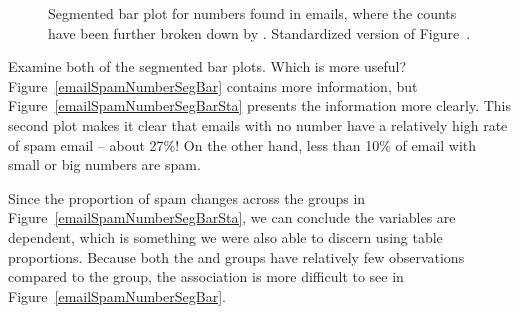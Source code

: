 \begin{figure}[h]
\centering
{}
\caption{ Segmented bar plot for numbers found in emails, where the counts have been further broken down by .  Standardized version of Figure~.}
\label{emailSpamNumberSegBarPlot}
\end{figure}

\begin{example}{Examine both of the segmented bar plots. Which is more useful?}
Figure~\ref{emailSpamNumberSegBar} contains more information, but Figure~\ref{emailSpamNumberSegBarSta} presents the information more clearly. This second plot makes it clear that emails with no number have a relatively high rate of spam email -- about 27\%! On the other hand, less than 10\% of email with small or big numbers are spam.
\end{example}

Since the proportion of spam changes across the groups in Figure~\ref{emailSpamNumberSegBarSta}, we can conclude the variables are dependent, which is something we were also able to discern using table proportions. Because both the  and  groups have relatively few observations compared to the  group, the association is more difficult to see in Figure~\ref{emailSpamNumberSegBar}.

